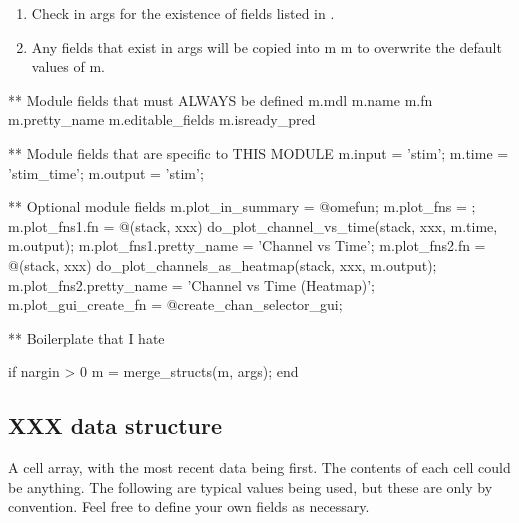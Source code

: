 \documentclass{article}
\begin{document}
\begin{enumerate}
\begin{enumerate}
\item Check in args for the existence of fields listed in .
\item Any fields that exist in args will be copied into m
m to overwrite the default values of m.
\end{enumerate}
\end{enumerate}


** Module fields that must ALWAYS be defined
   m.mdl
   m.name 
   m.fn 
   m.pretty_name 
   m.editable_fields 
   m.isready_pred 
   
** Module fields that are specific to THIS MODULE
   m.input = 'stim'; 
   m.time  = 'stim_time';
   m.output = 'stim';
   
** Optional module fields
   m.plot_in_summary = @omefun;
   m.plot_fns = {};
   m.plot_fns{1}.fn = @(stack, xxx) do_plot_channel_vs_time(stack, xxx, m.time, m.output);
   m.plot_fns{1}.pretty_name = 'Channel vs Time';
   m.plot_fns{2}.fn = @(stack, xxx) do_plot_channels_as_heatmap(stack, xxx, m.output);
   m.plot_fns{2}.pretty_name = 'Channel vs Time (Heatmap)';
   m.plot_gui_create_fn = @create_chan_selector_gui;
   
** Boilerplate that I hate
   
   if nargin > 0
   m = merge_structs(m, args);
   end
   

\subsection{XXX data structure}

  A cell array, with the most recent data being first. The contents of each cell could be anything. The following are typical values being used, but these are only by convention. Feel free to define your own fields as necessary.
 
\end{document}

